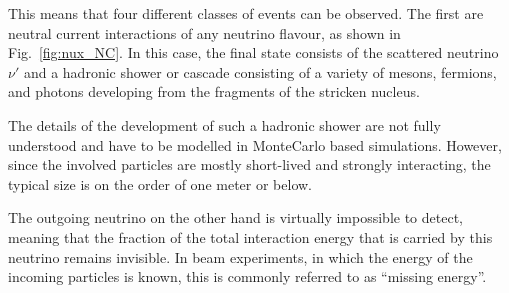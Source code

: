 This means that four different classes of events can be observed. The first are
neutral current interactions of any neutrino flavour, as shown in
Fig.~\ref{fig:nux_NC}. In this case, the final state consists of the scattered
neutrino $\nu'$ and a hadronic shower or cascade consisting of a variety of
mesons, fermions, and photons developing from the fragments of the stricken
nucleus.

The details of the development of such a hadronic shower are not fully
understood and have to be modelled in MonteCarlo based simulations. However,
since the involved particles are mostly short-lived and strongly interacting,
the typical size is on the order of one meter or below. 

The outgoing neutrino on the other hand is virtually impossible to detect,
meaning that the fraction of the total interaction energy that is carried by
this neutrino remains invisible. In beam experiments, in which the energy of the
incoming particles is known, this is commonly referred to as ``missing energy''.

